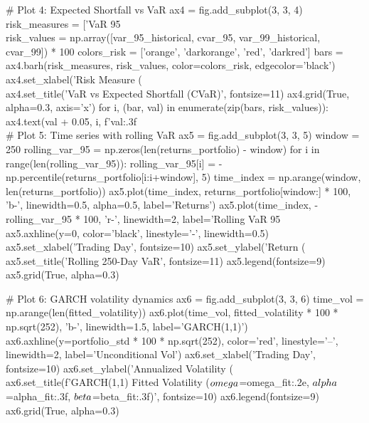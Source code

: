 \documentclass[11pt,a4paper]{article}
\begin{document}
\begin{pycode}
# Plot 4: Expected Shortfall vs VaR
ax4 = fig.add_subplot(3, 3, 4)
risk_measures = ['VaR 95\\%
risk_values = np.array([var_95_historical, cvar_95, var_99_historical, cvar_99]) * 100
colors_risk = ['orange', 'darkorange', 'red', 'darkred']
bars = ax4.barh(risk_measures, risk_values, color=colors_risk, edgecolor='black')
ax4.set_xlabel('Risk Measure (\\%
ax4.set_title('VaR vs Expected Shortfall (CVaR)', fontsize=11)
ax4.grid(True, alpha=0.3, axis='x')
for i, (bar, val) in enumerate(zip(bars, risk_values)):
    ax4.text(val + 0.05, i, f'{val:.3f}\\%

# Plot 5: Time series with rolling VaR
ax5 = fig.add_subplot(3, 3, 5)
window = 250
rolling_var_95 = np.zeros(len(returns_portfolio) - window)
for i in range(len(rolling_var_95)):
    rolling_var_95[i] = -np.percentile(returns_portfolio[i:i+window], 5)
time_index = np.arange(window, len(returns_portfolio))
ax5.plot(time_index, returns_portfolio[window:] * 100, 'b-', linewidth=0.5, alpha=0.5, label='Returns')
ax5.plot(time_index, -rolling_var_95 * 100, 'r-', linewidth=2, label='Rolling VaR 95\\%
ax5.axhline(y=0, color='black', linestyle='-', linewidth=0.5)
ax5.set_xlabel('Trading Day', fontsize=10)
ax5.set_ylabel('Return (\\%
ax5.set_title('Rolling 250-Day VaR', fontsize=11)
ax5.legend(fontsize=9)
ax5.grid(True, alpha=0.3)

# Plot 6: GARCH volatility dynamics
ax6 = fig.add_subplot(3, 3, 6)
time_vol = np.arange(len(fitted_volatility))
ax6.plot(time_vol, fitted_volatility * 100 * np.sqrt(252), 'b-', linewidth=1.5, label='GARCH(1,1)')
ax6.axhline(y=portfolio_std * 100 * np.sqrt(252), color='red', linestyle='--', linewidth=2, label='Unconditional Vol')
ax6.set_xlabel('Trading Day', fontsize=10)
ax6.set_ylabel('Annualized Volatility (\\%
ax6.set_title(f'GARCH(1,1) Fitted Volatility ($\\omega$={omega_fit:.2e}, $\\alpha$={alpha_fit:.3f}, $\\beta$={beta_fit:.3f})', fontsize=10)
ax6.legend(fontsize=9)
ax6.grid(True, alpha=0.3)


\end{pycode}
\end{document}
